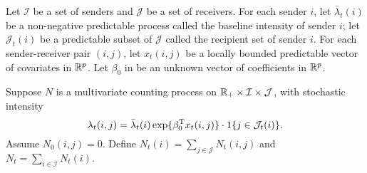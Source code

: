 \documentclass[aoas,preprint]{imsart}
\begin{document}
Let $\mathcal{I}$ be a set of senders and $\mathcal{J}$ be a set of
receivers.  
For each sender $i$, let $\bar \lambda_t(i)$ be a non-negative predictable
process called the baseline intensity of sender $i$; let
$\mathcal{J}_t(i)$ be a predictable subset of $\mathcal{J}$ called the 
recipient set of sender $i$.
For each sender-receiver pair $(i,j)$, let $x_t(i,j)$ be a locally bounded
predictable vector of covariates in $\mathbb{R}^p$.  Let $\beta_0$ in
be an unknown vector of coefficients in  $\mathbb{R}^p$.

Suppose $N$ is a multivariate counting process on 
$\mathbb{R}_+ \times \mathcal{I} \times \mathcal{J}$,
with stochastic intensity
\begin{equation}\label{E:cox-intensity}
    \lambda_t(i,j)
        =
        \bar \lambda_t(i)
        \exp\{ \beta_0^\trans x_t(i, j) \}
        \cdot
        1{\{j \in \mathcal{J}_t(i)\}}.
\end{equation}
Assume $N_0(i,j) = 0$.  Define
\(
    N_t(i) = \sum_{j \in \mathcal{J}} N_t(i,j)
\)
and
\(
    N_t = \sum_{i \in \mathcal{I}} N_t(i).
\)
\end{document}
